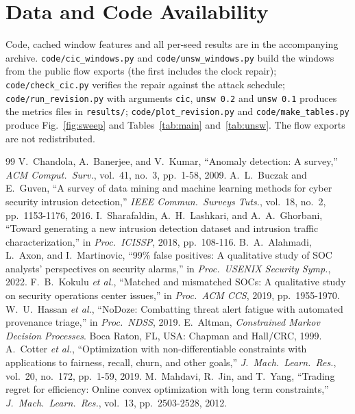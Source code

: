 \documentclass[journal,10pt,twocolumn]{IEEEtran}
\begin{document}
\section*{Data and Code Availability}
Code, cached window features and all per-seed results are in the accompanying archive. \texttt{code/cic\_windows.py} and \texttt{code/unsw\_windows.py} build the windows from the public flow exports (the first includes the clock repair); \texttt{code/check\_cic.py} verifies the repair against the attack schedule; \texttt{code/run\_revision.py} with arguments \texttt{cic}, \texttt{unsw 0.2} and \texttt{unsw 0.1} produces the metrics files in \texttt{results/}; \texttt{code/plot\_revision.py} and \texttt{code/make\_tables.py} produce Fig.~\ref{fig:sweep} and Tables~\ref{tab:main} and~\ref{tab:unsw}. The flow exports are not redistributed.
\begin{thebibliography}{99}
 V.~Chandola, A.~Banerjee, and V.~Kumar, ``Anomaly detection: A survey,'' \emph{ACM Comput.\ Surv.}, vol.~41, no.~3, pp.~1-58, 2009.
 A.~L.~Buczak and E.~Guven, ``A survey of data mining and machine learning methods for cyber security intrusion detection,'' \emph{IEEE Commun.\ Surveys Tuts.}, vol.~18, no.~2, pp.~1153-1176, 2016.
 I.~Sharafaldin, A.~H.~Lashkari, and A.~A.~Ghorbani, ``Toward generating a new intrusion detection dataset and intrusion traffic characterization,'' in \emph{Proc.\ ICISSP}, 2018, pp.~108-116.
 B.~A.~Alahmadi, L.~Axon, and I.~Martinovic, ``99\% false positives: A qualitative study of SOC analysts' perspectives on security alarms,'' in \emph{Proc.\ USENIX Security Symp.}, 2022.
 F.~B.~Kokulu \emph{et al.}, ``Matched and mismatched SOCs: A qualitative study on security operations center issues,'' in \emph{Proc.\ ACM CCS}, 2019, pp.~1955-1970.
 W.~U.~Hassan \emph{et al.}, ``NoDoze: Combatting threat alert fatigue with automated provenance triage,'' in \emph{Proc.\ NDSS}, 2019.
 E.~Altman, \emph{Constrained Markov Decision Processes}. Boca Raton, FL, USA: Chapman and Hall/CRC, 1999.
 A.~Cotter \emph{et al.}, ``Optimization with non-differentiable constraints with applications to fairness, recall, churn, and other goals,'' \emph{J.\ Mach.\ Learn.\ Res.}, vol.~20, no.~172, pp.~1-59, 2019.
 M.~Mahdavi, R.~Jin, and T.~Yang, ``Trading regret for efficiency: Online convex optimization with long term constraints,'' \emph{J.\ Mach.\ Learn.\ Res.}, vol.~13, pp.~2503-2528, 2012.

\end{thebibliography}
\end{document}
